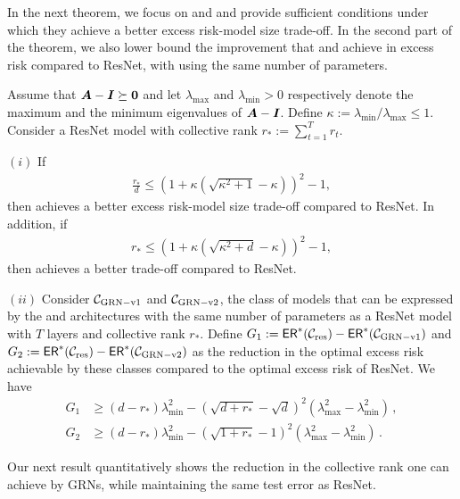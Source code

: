 In the next theorem, we focus on \GenA{} and \GenB{} and provide sufficient conditions under which they achieve a better excess risk-model size trade-off. In the second part of the theorem, we also lower bound the improvement that \GenA{} and \GenB{} achieve in excess risk compared to ResNet, with using the same number of parameters.

\begin{theorem}\label{thm:trade-off}
Assume that ${\bm{A}}-\bm{I} \succeq \bf{0}$ and let $\lambda_{\max}$ and $\lambda_{\min}>0$ respectively denote the maximum and the minimum eigenvalues of ${\bm{A}}-\bm{I}$. Define $\kappa:=\lambda_{\min}/\lambda_{\max}\le 1$. Consider a ResNet model with collective rank $r_*:=\sum_{t=1}^T r_t$. %

$(i)$ If 
\begin{align}\label{eq:condition1}
\frac{r_*}{d} \le (1+\kappa(\sqrt{\kappa^2+1}-\kappa))^2 - 1,
\end{align}
then \GenA{} achieves a better excess risk-model size trade-off compared to ResNet. In addition, if 
\begin{align}\label{eq:condition2}
r_*\le (1+\kappa(\sqrt{\kappa^2+d}-\kappa))^2 - 1,
\end{align}
then \GenB{} achieves a better  trade-off compared to ResNet.

$(ii)$ Consider $\mathcal{C}_{\rm GRN-v1{}}$ and $\mathcal{C}_{\rm GRN-v2{}}$, the class of models that can be expressed by the \GenA{} and \GenB{} architectures with the same number of parameters as a ResNet model with $T$ layers and collective rank $r_*$. Define $G_1: ={\sf ER}^*(\mathcal{C}_{\rm res}) - {\sf ER}^*(\mathcal{C}_{\rm GRN-v1{}})$ and $G_2: ={\sf ER}^*(\mathcal{C}_{\rm res}) - {\sf ER}^*(\mathcal{C}_{\rm GRN-v2{}})$ as the reduction in the optimal excess risk achievable by these classes compared to the optimal excess risk of ResNet. %
We have
\begin{align*}
G_1 &\ge
(d-r_*)\lambda_{\min}^2 - (\sqrt{d+r_*}-\sqrt{d})^2(\lambda_{\max}^2- \lambda_{\min}^2)\,,\\
G_2 &\ge (d-r_*)\lambda_{\min}^2 - (\sqrt{1+r_*}-1)^2(\lambda_{\max}^2- \lambda_{\min}^2)\,.
\end{align*}
\end{theorem}

Our next result quantitatively shows the reduction in the collective rank one can achieve by GRNs, while maintaining the same test error as ResNet.


